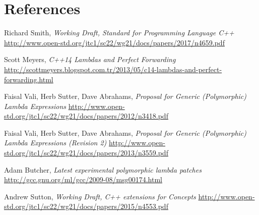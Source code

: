 \documentclass{wg21}
\begin{document}
\section{References}
\renewcommand{\section}[2]{}%
\begin{thebibliography}{9}

    Richard Smith,
    \emph{Working Draft, Standard for Programming Language C++}\newline
    \url{http://www.open-std.org/jtc1/sc22/wg21/docs/papers/2017/n4659.pdf}

    Scott Meyers,
    \emph{C++14 Lambdas and Perfect Forwarding}\newline
    \url{http://scottmeyers.blogspot.com.tr/2013/05/c14-lambdas-and-perfect-forwarding.html}

    Faisal Vali, Herb Sutter, Dave Abrahams,
    \emph{Proposal for Generic (Polymorphic) Lambda Expressions}\newline
    \url{http://www.open-std.org/jtc1/sc22/wg21/docs/papers/2012/n3418.pdf}

    Faisal Vali, Herb Sutter, Dave Abrahams,
    \emph{Proposal for Generic (Polymorphic) Lambda Expressions (Revision 2)}\newline
    \url{http://www.open-std.org/jtc1/sc22/wg21/docs/papers/2013/n3559.pdf}

    Adam Butcher,
    \emph{Latest experimental polymorphic lambda patches}\newline
    \url{http://gcc.gnu.org/ml/gcc/2009-08/msg00174.html}

    Andrew Sutton,
    \emph{Working Draft, C++ extensions for Concepts}\newline
    \url{http://www.open-std.org/jtc1/sc22/wg21/docs/papers/2015/n4553.pdf}

\end{thebibliography}
\end{document}

